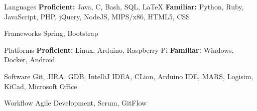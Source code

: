 
\vspace{0mm}
\begin{cvskills}

  \vspace{1mm}

  \cvskill
    {Languages} %
    {\textbf{Proficient:} Java, C, Bash, SQL, LaTeX \newline \textbf{Familiar:} Python, Ruby, JavaScript, PHP, jQuery, NodeJS, MIPS/x86, HTML5, CSS} %

  \vspace{1mm}

  \cvskill
    {Frameworks} %
    {Spring, Bootstrap} %

  \vspace{1mm}

  \cvskill
    {Platforms} %
    {\textbf{Proficient:} Linux, Arduino, Raspberry Pi \newline \textbf{Familiar:} Windows, Docker, Android} %

  \vspace{1mm}

  \cvskill
    {Software} %
    {Git, JIRA, GDB, IntelliJ IDEA, CLion, Arduino IDE, MARS, Logisim, KiCad, Microsoft Office} %

  \cvskill
    {Workflow} %
    {Agile Development, Scrum, GitFlow} %

\end{cvskills}
